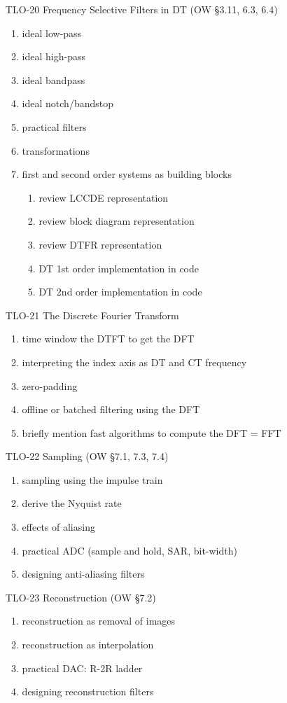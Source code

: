 \begin{enumerate}
\item[TLO-20] Frequency Selective Filters in DT (OW \S 3.11, 6.3, 6.4)
  \begin{enumerate}
  \item ideal low-pass
  \item ideal high-pass
  \item ideal bandpass
  \item ideal notch/bandstop
  \item practical filters
  \item transformations
  \item first and second order systems as building blocks
    \begin{enumerate}
    \item review LCCDE representation
    \item review block diagram representation
    \item review DTFR representation
    \item DT 1st order implementation in code
    \item DT 2nd order implementation in code
    \end{enumerate}
  \end{enumerate}
  
\item[TLO-21] The Discrete Fourier Transform
  \begin{enumerate}
  \item time window the DTFT to get the DFT
  \item interpreting the index axis as DT and CT frequency
  \item zero-padding
  \item offline or batched filtering using the DFT
  \item briefly mention fast algorithms to compute the DFT = FFT
  \end{enumerate}
  
\item[TLO-22] Sampling (OW \S 7.1, 7.3, 7.4)
  \begin{enumerate}
  \item sampling using the impulse train
  \item derive the Nyquist rate
  \item effects of aliasing
  \item practical ADC (sample and hold, SAR, bit-width)
  \item designing anti-aliasing filters
  \end{enumerate}

\item[TLO-23] Reconstruction (OW \S 7.2)
  \begin{enumerate}
  \item reconstruction as removal of images
  \item reconstruction as interpolation
  \item practical DAC: R-2R ladder
  \item designing reconstruction filters
  \end{enumerate}
\end{enumerate}

